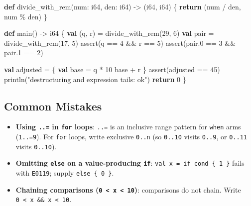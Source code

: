 \documentclass[
  english,
  oneside]{book}
\newenvironment{Shaded}{\begin{snugshade}}{\end{snugshade}}
\newcommand{\ControlFlowTok}[1]{\textcolor[rgb]{0.77,0.53,0.75}{\textbf{#1}}}
\newcommand{\DataTypeTok}[1]{\textcolor[rgb]{0.31,0.79,0.69}{#1}}
\newcommand{\DecValTok}[1]{\textcolor[rgb]{0.71,0.81,0.66}{#1}}
\newcommand{\FunctionTok}[1]{\textcolor[rgb]{0.86,0.86,0.67}{#1}}
\newcommand{\KeywordTok}[1]{\textcolor[rgb]{0.34,0.61,0.84}{\textbf{#1}}}
\newcommand{\NormalTok}[1]{\textcolor[rgb]{0.83,0.83,0.83}{#1}}
\newcommand{\OperatorTok}[1]{\textcolor[rgb]{0.83,0.83,0.83}{#1}}
\newcommand{\StringTok}[1]{\textcolor[rgb]{0.81,0.57,0.47}{#1}}
\providecommand{\tightlist}{%
  \setlength{\itemsep}{0pt}\setlength{\parskip}{0pt}}
\begin{document}
\begin{Shaded}
\begin{Highlighting}[]
\KeywordTok{def}\NormalTok{ divide\_with\_rem(num: }\DataTypeTok{i64}\NormalTok{, den: }\DataTypeTok{i64}\NormalTok{) }\OperatorTok{{-}\textgreater{}}\NormalTok{ (}\DataTypeTok{i64}\NormalTok{, }\DataTypeTok{i64}\NormalTok{) \{}
    \ControlFlowTok{return}\NormalTok{ (num }\OperatorTok{/}\NormalTok{ den, num }\OperatorTok{\%}\NormalTok{ den)}
\NormalTok{\}}

\KeywordTok{def}\NormalTok{ main() }\OperatorTok{{-}\textgreater{}} \DataTypeTok{i64}\NormalTok{ \{}
    \KeywordTok{val}\NormalTok{ (q, r) }\OperatorTok{=}\NormalTok{ divide\_with\_rem(}\DecValTok{29}\NormalTok{, }\DecValTok{6}\NormalTok{)}
    \KeywordTok{val}\NormalTok{ pair }\OperatorTok{=}\NormalTok{ divide\_with\_rem(}\DecValTok{17}\NormalTok{, }\DecValTok{5}\NormalTok{)}
    \FunctionTok{assert}\NormalTok{(q }\OperatorTok{==} \DecValTok{4} \OperatorTok{\&\&}\NormalTok{ r }\OperatorTok{==} \DecValTok{5}\NormalTok{)}
    \FunctionTok{assert}\NormalTok{(pair}\OperatorTok{.}\DecValTok{0} \OperatorTok{==} \DecValTok{3} \OperatorTok{\&\&}\NormalTok{ pair}\OperatorTok{.}\DecValTok{1} \OperatorTok{==} \DecValTok{2}\NormalTok{)}

    \KeywordTok{val}\NormalTok{ adjusted }\OperatorTok{=}\NormalTok{ \{}
        \KeywordTok{val}\NormalTok{ base }\OperatorTok{=}\NormalTok{ q }\OperatorTok{*} \DecValTok{10}
\NormalTok{        base }\OperatorTok{+}\NormalTok{ r}
\NormalTok{    \}}
    \FunctionTok{assert}\NormalTok{(adjusted }\OperatorTok{==} \DecValTok{45}\NormalTok{)}
\NormalTok{    println(}\StringTok{"destructuring and expression tails: ok"}\NormalTok{)}
    \ControlFlowTok{return} \DecValTok{0}
\NormalTok{\}}
\end{Highlighting}
\end{Shaded}

\subsection{Common Mistakes}\label{common-mistakes-3}

\begin{itemize}
\tightlist
\item
  \textbf{Using \texttt{..=} in \texttt{for} loops}: \texttt{..=} is an
  inclusive range pattern for \texttt{when} arms (\texttt{1..=9}). For
  \texttt{for} loops, write exclusive \texttt{0..n} (so \texttt{0..10}
  visits \texttt{0..9}, or \texttt{0..11} visits \texttt{0..10}).
\item
  \textbf{Omitting \texttt{else} on a value-producing \texttt{if}}:
  \texttt{val\ x\ =\ if\ cond\ \{\ 1\ \}} fails with \texttt{E0119};
  supply \texttt{else\ \{\ 0\ \}}.
\item
  \textbf{Chaining comparisons
  (\texttt{0\ \textless{}\ x\ \textless{}\ 10})}: comparisons do not
  chain. Write \texttt{0\ \textless{}\ x\ \&\&\ x\ \textless{}\ 10}.
\end{itemize}
\end{document}

